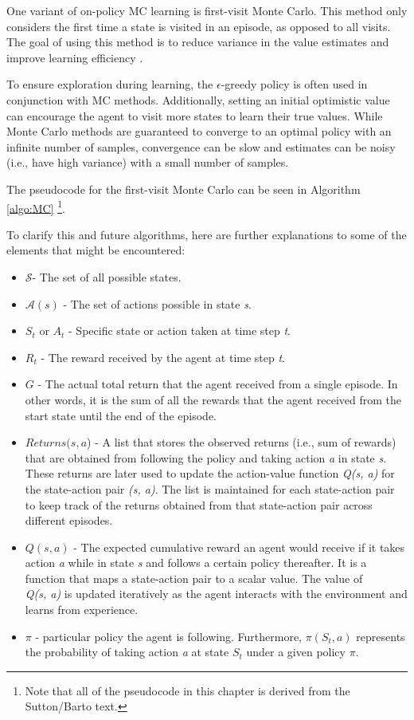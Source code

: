One variant of on-policy MC learning is first-visit Monte Carlo. This method only considers the first time a state is visited in an episode, as opposed to all visits. The goal of using this method is to reduce variance in the value estimates and improve learning efficiency  \citep{RLSuttonBarto}. 

To ensure exploration during learning, the $\epsilon$-greedy policy is often used in conjunction with MC methods. Additionally, setting an initial optimistic value can encourage the agent to visit more states to learn their true values. While Monte Carlo methods are guaranteed to converge to an optimal policy with an infinite number of samples, convergence can be slow and estimates can be noisy (i.e., have high variance) with a small number of samples.

The pseudocode for the first-visit Monte Carlo can be seen in Algorithm \ref{algo:MC}  \citep{RLSuttonBarto}\footnote{Note that all of the pseudocode in this chapter is derived from the Sutton/Barto text.}.

To clarify this and future algorithms, here are further explanations to some of the elements that might be encountered:
\begin{itemize}
\item $\mathcal{S}$- The set of all possible states.
\item $\mathcal{A}(s)$ - The set of actions possible in state \textit{s}.
\item $S_t$ or $A_t$ - Specific state or action taken at time step \textit{t}.
\item $R_{t}$ -  The reward received by the agent at time step \textit{t}.
\item $G$ - The actual total return that the agent received from a single episode. In other words, it is the sum of all the rewards that the agent received from the start state until the end of the episode.
\item $Returns(s, a$) - A list that stores the observed returns (i.e., sum of rewards) that are obtained from following the policy and taking action \textit{a} in state \textit{s}. These returns are later used to update the action-value function \textit{Q(s, a)} for the state-action pair \textit{(s, a)}. The list is maintained for each state-action pair to keep track of the returns obtained from that state-action pair across different episodes.
\item $Q(s, a)$ -  The expected cumulative reward an agent would receive if it takes action \textit{a} while in state \textit{s} and follows a certain policy thereafter. It is a function that maps a state-action pair to a scalar value. The value of \\ \textit{Q(s, a)} is updated iteratively as the agent interacts with the environment and learns from experience.
\item  $\pi$ - particular policy the agent is following. Furthermore, \textit{$\pi(S_t,a)$} represents the probability of taking action \textit{a} at state \textit{$S_t$} under a given policy \textit{$\pi$}.
\end{itemize}

